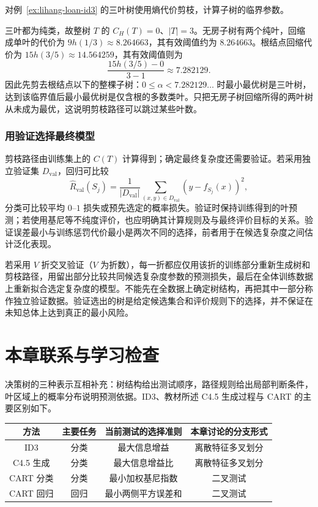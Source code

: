 \begin{example}
\label{ex:lihang-loan-pruning}
对例~\ref{ex:lihang-loan-id3} 的三叶树使用熵代价剪枝，计算子树的临界参数。
\end{example}
\begin{solve}
三叶都为纯类，故整树 $T$ 的 $C_H(T)=0$、$|T|=3$。无房子树有两个纯叶，回缩成单叶的代价为 $9h(1/3)\approx8.264663$，其有效阈值约为 $8.264663$。根结点回缩代价为 $15h(3/5)\approx14.564259$，其有效阈值则为
\[
  \frac{15h(3/5)-0}{3-1}\approx7.282129.
\]
因此先剪去根结点以下的整棵子树：$0\leq\alpha<7.282129\ldots$ 时最小最优树是三叶树，达到该临界值后最小最优树是仅含根的多数类叶。只把无房子树回缩所得的两叶树从未成为最优，这说明剪枝路径可以跳过某些叶数。
\end{solve}

\subsubsection{用验证选择最终模型}

剪枝路径由训练集上的 $C(T)$ 计算得到；确定最终复杂度还需要验证。若采用独立验证集 $D_{\mathrm{val}}$，回归可比较
\[
  \widehat R_{\mathrm{val}}(S_j)
  =\frac1{|D_{\mathrm{val}}|}\sum_{(x,y)\in D_{\mathrm{val}}}(y-f_{S_j}(x))^2,
\]
分类可比较平均 $0$--$1$ 损失或预先选定的概率损失。验证时保持训练得到的叶预测；若使用基尼等不纯度评价，也应明确其计算规则及与最终评价目标的关系。验证误差最小与训练惩罚代价最小是两次不同的选择，前者用于在候选复杂度之间估计泛化表现。

若采用 $V$ 折交叉验证（$V$ 为折数），每一折都应仅用该折的训练部分重新生成树和剪枝路径，用留出部分比较共同候选复杂度参数的预测损失，最后在全体训练数据上重新拟合选定复杂度的模型。不能先在全数据上确定树结构，再把其中一部分称作独立验证数据。验证选出的树是给定候选集合和评价规则下的选择，并不保证在未知总体上达到真正的最小风险。

\section{本章联系与学习检查}
\label{sec:lihang-tree-review}

决策树的三种表示互相补充：树结构给出测试顺序，路径规则给出局部判断条件，叶区域上的概率分布说明预测依据。ID3、教材所述 C4.5 生成过程与 CART 的主要区别如下。
\begin{center}
  \begin{tabular}{cccc}
    \toprule
    方法 & 主要任务 & 当前测试的选择准则 & 本章讨论的分支形式 \\
    \midrule
    ID3 & 分类 & 最大信息增益 & 离散特征多叉划分 \\
    C4.5 生成 & 分类 & 最大信息增益比 & 离散特征多叉划分 \\
    CART 分类 & 分类 & 最小加权基尼指数 & 二叉测试 \\
    CART 回归 & 回归 & 最小两侧平方误差和 & 二叉测试 \\
    \bottomrule
  \end{tabular}
\end{center}

